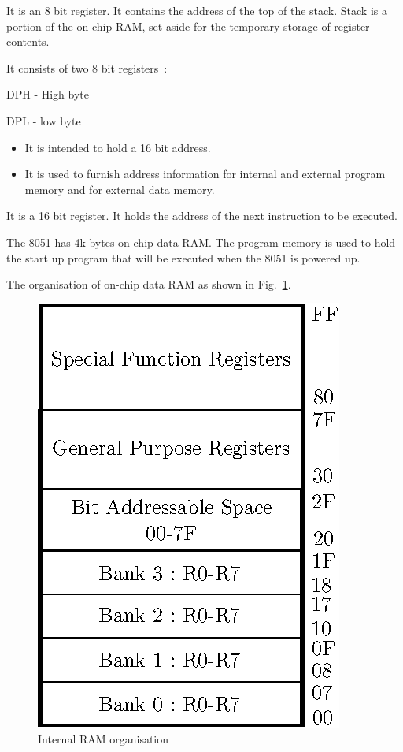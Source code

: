 \medskip
{}

\smallskip
It is an 8 bit register. It contains the address of the top of the stack. Stack is a portion of the on chip RAM, set aside for the temporary storage of register contents.

\medskip
{}

\smallskip
It consists of two 8 bit registers~:

DPH - High byte

DPL - low byte
\begin{itemize}
\item It is intended to hold a 16 bit address.

\item It is used to furnish address information for internal and external program memory and for external data memory.
\end{itemize}


\smallskip
It is a 16 bit register. It holds the address of the next instruction to be executed.

\eject


\smallskip
The 8051 has 4k bytes on-chip data RAM. The program memory is used to hold the start up program that will be executed when the 8051 is powered up.

The organisation of on-chip data RAM as shown in Fig.~\ref{fig7.10}.
\begin{figure}[H]
\centering
\includegraphics{chap7/fig7.9.eps}
\caption{Internal RAM organisation}\label{fig7.10}
\end{figure}

